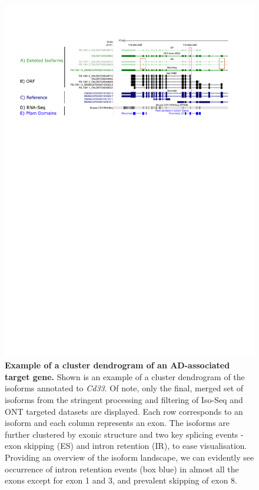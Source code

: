 \begin{figure}[htp]
	\centering
	\includegraphics[page=2,trim={1cm 15cm 0 2cm},scale = 0.85]{Figures/ExamplePlots.pdf}
	\captionsetup{width=0.95\textwidth, singlelinecheck=off}
	\caption[Example of a cluster dendrogram of an AD-associated target gene]%
	{\textbf{Example of a cluster dendrogram of an AD-associated target gene.} Shown is an example of a cluster dendrogram of the isoforms annotated to \textit{Cd33}. Of note, only the final, merged set of isoforms from the stringent processing and filtering of Iso-Seq and ONT targeted datasets are displayed. Each row corresponds to an isoform and each column represents an exon. The isoforms are further clustered by exonic structure and two key splicing events - exon skipping (ES) and intron retention (IR), to ease visualisation. Providing an overview of the isoform landscape, we can evidently see occurrence of intron retention events (box blue) in almost all the exons except for exon 1 and 3, and prevalent skipping of exon 8. 
	}   
	\label{fig:eg_heatmap}
\end{figure}

